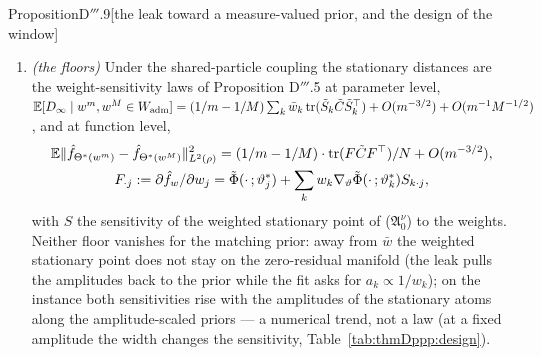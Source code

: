 \begin{thm}{Proposition}{D$'''$.9}[the leak toward a measure-valued prior, and the design of the window]
\begin{enumerate}[label=\textup{(\roman*)}]
    $\supp\rho$ --- then $\mu^* := \sum_kq_k\delta_{\vartheta^0_k}$ is a stationary measure of
    \textup{($\mathfrak{A}_0^\nu$)} with $r_{\mu^*} = 0$, $R[\mu^*]\equiv0$, and the window of Remark D$'''$.1 has
    its maximal margin: $\kappa_R[\mu^*](A) = 0$ for every set $A$ ($R[\mu^*]\equiv0$) and $\kappa = \sigma_0$, the
    only restriction on $\varrho'$ being (i)'s Voronoi hypothesis, against
    $\kappa = \sigma_0 - \kappa_R[\mu^*_\sigma](N_{\varrho'})$ for the $\sigma$-modification's stationary measure
    $\mu^*_\sigma$, whose residual is the leak's bias. For a prior $\nu_\delta$ displaced from the exact
    representation the residual of the stationary measure is $O(\delta)$ and
    $\kappa_R[\mu^*_{\nu_\delta}] = O(\delta)$: the margin decreases with the misplacement, and the window closes
    when the displacement makes the residual-weighted curvature at an atom reach $\sigma_0$.
  \item \emph{(the floors)} Under the shared-particle coupling the stationary distances are the weight-sensitivity
    laws of Proposition D$'''$.5 at parameter level,
    $\mathbb{E}[D_\infty\mid w^m, w^M\in W_{\mathrm{adm}}] = (1/m - 1/M)\sum_k\bar w_k\operatorname{tr}(\tilde S_k\tilde C\tilde S_k^\top)
    + O(m^{-3/2}) + O(m^{-1}M^{-1/2})$, and at function level,
    \begin{gather*}
      \mathbb{E}\lVert \hat f_{\Theta^*(w^m)} - \hat f_{\Theta^*(w^M)}\rVert^2_{L^2(\rho)}
      = (1/m - 1/M)\cdot\operatorname{tr}(F\tilde CF^\top)/N + O(m^{-3/2}),\\
      F_{\cdot j} := \partial\hat f_w/\partial w_j
      = \tilde\Phi(\cdot\,;\vartheta^*_j) + \sum_kw_k\nabla_\vartheta\tilde\Phi(\cdot\,;\vartheta^*_k)S_{k\cdot j},
    \end{gather*}
    with $S$ the sensitivity of the weighted stationary point of \textup{($\mathfrak{A}_0^\nu$)} to the weights.
    Neither floor vanishes for the matching prior: away from $\bar w$ the weighted stationary point does not stay on
    the zero-residual manifold (the leak pulls the amplitudes back to the prior while the fit asks for
    $a_k\propto1/w_k$); on the instance both sensitivities rise with the amplitudes of the stationary atoms along the
    amplitude-scaled priors --- a numerical trend, not a law (at a fixed amplitude the width changes the
    sensitivity, Table~\ref{tab:thmDppp:design}).
\end{enumerate}
\end{thm}
